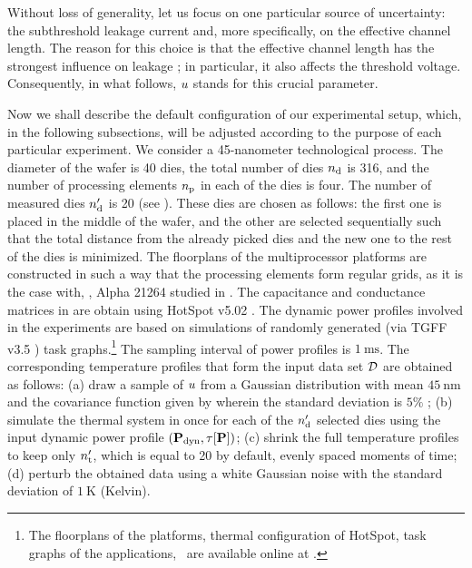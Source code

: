Without loss of generality, let us focus on one particular source of uncertainty: the subthreshold leakage current and, more specifically, on the effective channel length.
The reason for this choice is that the effective channel length has the strongest influence on leakage \cite{chandrakasan2001, srivastava2010, juan2011, juan2012}; in particular, it also affects the threshold voltage. Consequently, in what follows, $u$ stands for this crucial parameter.

Now we shall describe the default configuration of our experimental setup, which, in the following subsections, will be adjusted according to the purpose of each particular experiment.
We consider a 45-nanometer technological process. The diameter of the wafer is 40 dies, the total number of dies ${n_\text{d}}$ is 316, and the number of processing elements ${n_\text{p}}$ in each of the dies is four.
The number of measured dies ${n_\text{d}'}$ is 20 (see ). These dies are chosen as follows: the first one is placed in the middle of the wafer, and the other are selected sequentially such that the total distance from the already picked dies and the new one to the rest of the dies is minimized.
The floorplans of the multiprocessor platforms are constructed in such a way that the processing elements form regular grids, as it is the case with, \eg, Alpha 21264 studied in \cite{juan2011}. The capacitance and conductance matrices in  are obtain using HotSpot v5.02 \cite{hotspot}.
The dynamic power profiles involved in the experiments are based on simulations of randomly generated (via TGFF v3.5 \cite{dick1998}) task graphs.\footnote{The floorplans of the platforms, thermal configuration of HotSpot, task graphs of the applications, \etc\ are available online at \cite{sources}.} The sampling interval of power profiles is $1~\text{ms}$.
The corresponding temperature profiles that form the input data set $\mathcal{D}$ are obtained as follows: (a) draw a sample of $u$ from a Gaussian distribution with mean $45~\text{nm}$ and the covariance function given by  wherein the standard deviation is $5\%$ \cite{juan2011, juan2012}; (b) simulate the thermal system in  once for each of the ${n_\text{d}'}$ selected dies using the input dynamic power profile $(\mathbf{P}_{\text{dyn}}, \tau[\mathbf{P}])$; (c) shrink the full temperature profiles to keep only ${n_\text{t}'}$, which is equal to 20 by default, evenly spaced moments of time; (d) perturb the obtained data using a white Gaussian noise with the standard deviation of $1~\text{K}$ (Kelvin).

